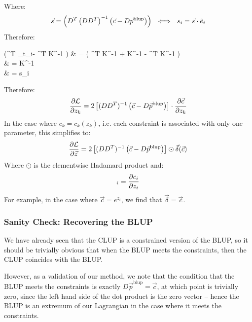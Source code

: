 \documentclass[]{article}
\def\ai{\vec{a}_{t_i}}
\begin{document}
			Where:
			\begin{equation}
				\vec{s} = \left(D^T \left(D D^T \right)^{-1} \left(\vec{c} - D \vec{p}^\text{blup}\right)\right) ~~\Longleftrightarrow~~ s_i = \vec{s} \cdot \hat{e}_i
			\end{equation}
			Therefore:
			\begin{spalign}
				 \cdot \left(\Delta^T \ai - \Delta^T K^{-1} \ki \right) & =  \cdot \left( \Delta^T K^{-1} \ki +  K^{-1} \Delta \X - \Delta^T K^{-1} \ki \right)
				\\
				& =   \cdot K^{-1} \Delta {}
				\\
				& = s_i
			\end{spalign}
			Therefore:
			\begin{equation}
				\frac{\partial \mathcal{L}}{\partial z_k} =2 \left[(DD^T)^{-1} \left(\vec{c} - D \vec{p}^\text{blup}\right) \right] \cdot \frac{\partial \vec{c}}{\partial z_k}
			\end{equation}
			In the case where $c_k = c_k(z_k)$, i.e. each constraint is associated with only one parameter, this simplifies to:
			\begin{equation}
				\frac{\partial \mathcal{L}}{\partial \vec{z}} =2 \left[(DD^T)^{-1} \left(\vec{c} - D \vec{p}^\text{blup}\right) \right] \odot \vec{\delta}(\vec{c}) \label{E:CLUP_GRAD}
			\end{equation}
			Where $\odot$ is the elementwise Hadamard product and:
			\begin{equation}
				[\vec{\delta}(\vec{c})]_i = \pdiv{c_i}{z_i}
			\end{equation}
			For example, in the case where $\vec{c} = e^{z_i}$, we find that $\vec{\delta} = \vec{c}$.
		
			\subsubsection{Sanity Check: Recovering the BLUP}

				We have already seen that the CLUP is a constrained version of the BLUP, so it should be trivially obvious that when the BLUP meets the constraints, then the CLUP coincides with the BLUP. 

				However, as a validation of our method, we note that the condition that the BLUP meets the constraints is exactly $D \vec{p}^\text{blup} = \vec{c}$, at which point  is trivially zero, since the left hand side of the dot product is the zero vector -- hence the BLUP is an extremum of our Lagrangian in the case where it meets the constraints. 
\end{document}

